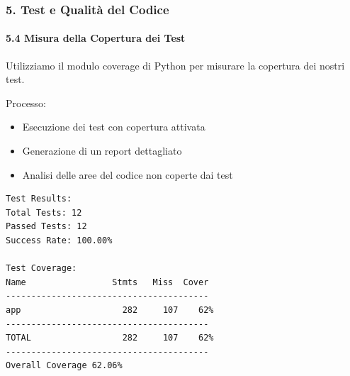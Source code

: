 \documentclass{beamer}
\begin{document}
\begin{frame}[fragile]
\frametitle{5. Test e Qualità del Codice}
\framesubtitle{5.4 Misura della Copertura dei Test}
Utilizziamo il modulo coverage di Python per misurare la copertura dei nostri test.

Processo:
\begin{itemize}
\item Esecuzione dei test con copertura attivata
\item Generazione di un report dettagliato
\item Analisi delle aree del codice non coperte dai test
\end{itemize}

\begin{lstlisting}[basicstyle=\tiny]
Test Results:
Total Tests: 12
Passed Tests: 12
Success Rate: 100.00%

Test Coverage:
Name                 Stmts   Miss  Cover
----------------------------------------
app                    282     107    62%
----------------------------------------
TOTAL                  282     107    62%
----------------------------------------
Overall Coverage 62.06%
\end{lstlisting}
\end{frame}
\end{document}

